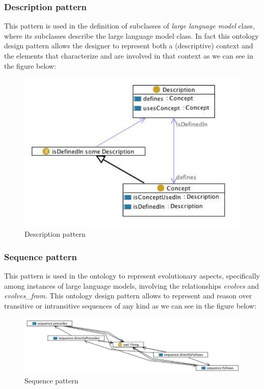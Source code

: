\subsubsection{Description pattern}
This pattern is used in the definition of subclasses of \textit{large language model} class, where its subclasses describe the large language model class. In fact this ontology design pattern allows the designer to represent both a (descriptive) context and the elements that characterize and are involved in that context\cite{description_pattern} as we can see in the figure below:

\begin{figure}[H]
    \centering
    \includegraphics[width=0.6\linewidth]{Figures/fig_73.png}
    \caption{Description pattern}
    \label{fig:enter-label}
\end{figure}

\subsubsection{Sequence pattern}
This pattern is used in the ontology to represent evolutionary aspects, specifically among instances of large language models, involving the relationships \textit{evolves} and \textit{evolves\_from}. This ontology design pattern allows to represent and reason over transitive or intransitive sequences of any kind\cite{sequence_pattern} as we can see in the figure below:
\begin{figure}[H]
    \centering
    \includegraphics[width=0.8\linewidth]{Figures/fig_74.png}
    \caption{Sequence pattern}
    \label{fig:enter-label}
\end{figure}

